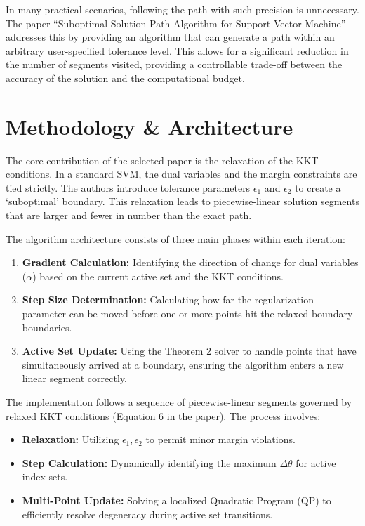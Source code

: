 \documentclass[journal,10pt,twocolumn,oneside]{IEEEtran}
\begin{document}
In many practical scenarios, following the path with such precision is unnecessary. The paper ``Suboptimal Solution Path Algorithm for Support Vector Machine'' addresses this by providing an algorithm that can generate a path within an arbitrary user-specified tolerance level. This allows for a significant reduction in the number of segments visited, providing a controllable trade-off between the accuracy of the solution and the computational budget.

\section{Methodology \& Architecture}
The core contribution of the selected paper is the relaxation of the KKT conditions. In a standard SVM, the dual variables and the margin constraints are tied strictly. The authors introduce tolerance parameters $\epsilon_1$ and $\epsilon_2$ to create a `suboptimal' boundary. This relaxation leads to piecewise-linear solution segments that are larger and fewer in number than the exact path.

The algorithm architecture consists of three main phases within each iteration:
\begin{enumerate}
    \item \textbf{Gradient Calculation:} Identifying the direction of change for dual variables ($\alpha$) based on the current active set and the KKT conditions.
    \item \textbf{Step Size Determination:} Calculating how far the regularization parameter can be moved before one or more points hit the relaxed boundary boundaries.
    \item \textbf{Active Set Update:} Using the Theorem 2 solver to handle points that have simultaneously arrived at a boundary, ensuring the algorithm enters a new linear segment correctly.
\end{enumerate}

The implementation follows a sequence of piecewise-linear segments governed by relaxed KKT conditions (Equation 6 in the paper). The process involves:
\begin{itemize}
    \item \textbf{Relaxation:} Utilizing $\epsilon_1, \epsilon_2$ to permit minor margin violations.
    \item \textbf{Step Calculation:} Dynamically identifying the maximum $\Delta\theta$ for active index sets.
    \item \textbf{Multi-Point Update:} Solving a localized Quadratic Program (QP) to efficiently resolve degeneracy during active set transitions.
\end{itemize}
\end{document}
